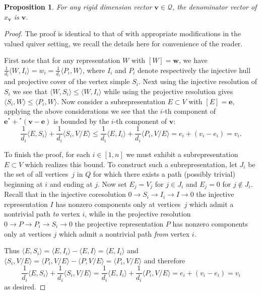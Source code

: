 \documentclass[pdftex]{sigma}
\newcommand{\bfe}{\mathbf{e}}
\newcommand{\bfv}{\mathbf{v}}
\newcommand{\bfw}{\mathbf{w}}
\newcommand{\cQ}{\mathcal{Q}}
\newtheorem{Proposition}[Theorem]{Proposition}
 { \theoremstyle{definition}
\newtheorem{Definition}[Theorem]{Definition}
\newtheorem{Note}[Theorem]{Note}
\newtheorem{Example}[Theorem]{Example}
\newtheorem{Remark}[Theorem]{Remark} }
\begin{document}
  \begin{Proposition}
    \label{prop:denominators}
    For any rigid dimension vector $\bfv\in\cQ$, the denominator vector of $x_\bfv$ is $\bfv$.
  \end{Proposition}
  \begin{proof}
    The proof is identical to that of \cite[Sec. 4, Cor. 2]{caldero-keller} with appropriate modifications in the valued quiver setting, we recall the details here for convenience of the reader.  

    First note that for any representation $W$ with $[W]=\bfw$, we have $\frac{1}{d_i}\langle W,I_i\rangle=w_i=\frac{1}{d_i}\langle P_i,W\rangle$, where $I_i$ and $P_i$ denote respectively the injective hull and projective cover of the vertex simple $S_i$.
    Next using the injective resolution of $S_i$ we see that $\langle W,S_i\rangle\le\langle W,I_i\rangle$ while using the projective resolution gives $\langle S_i,W\rangle\le\langle P_i,W\rangle$.  Now consider a subrepresentation $E\subset V$ with $[E]=\bfe$, applying the above considerations we see that the $i$-th component of $\bfe^*+{}^*(\bfv-\bfe)$ is bounded by the $i$-th component of $\bfv$:
    \[\frac{1}{d_i}\langle E,S_i\rangle+\frac{1}{d_i}\langle S_i,V/E\rangle\le\frac{1}{d_i}\langle E,I_i\rangle+\frac{1}{d_i}\langle P_i,V/E\rangle=e_i+(v_i-e_i)=v_i.\]

    To finish the proof, for each $i\in[1, n]$ we must exhibit a subrepresentation $E\subset V$ which realizes this bound.  
    To construct such a subrepresentation, let $J_i$ be the set of all vertices~$j$ in $Q$ for which there exists a path (possibly trivial) beginning at $i$ and ending at $j$.  
    Now set $E_j=V_j$ for $j\in J_i$ and $E_j=0$ for $j\notin J_i$.  
    Recall that in the injective coresolution $0\rightarrow S_i\rightarrow I_i\rightarrow I\rightarrow 0$ the injective representation $I$ has nonzero components only at vertices~$j$ which admit a nontrivial path \emph{to} vertex $i$, while in the projective resolution $0\rightarrow P\rightarrow P_i\rightarrow S_i\rightarrow 0$ the projective representation $P$ has nonzero components only at vertices $j$ which admit a nontrivial path \emph{from} vertex $i$.  

    Thus $\langle E,S_i\rangle=\langle E,I_i\rangle-\langle E,I\rangle=\langle E,I_i\rangle$ and $\langle S_i,V/E\rangle=\langle P_i,V/E\rangle-\langle P,V/E\rangle=\langle P_i,V/E\rangle$ and therefore 
    \[\frac{1}{d_i}\langle E,S_i\rangle+\frac{1}{d_i}\langle S_i,V/E\rangle=\frac{1}{d_i}\langle E,I_i\rangle+\frac{1}{d_i}\langle P_i,V/E\rangle=e_i+(v_i-e_i)=v_i\]
    as desired.
  \end{proof}
\end{document}

